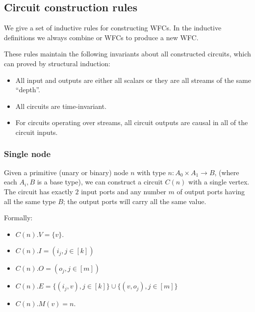 \subsection{Circuit construction rules}

We give a set of inductive rules for constructing WFCs.
In the inductive definitions we always combine or WFCs to
produce a new WFC.

These rules maintain the following invariants about all constructed circuits, which
can proved by structural induction:
\begin{itemize}
    \item All input and outputs are either all scalars
    or they are all streams of the same ``depth''.
    \item All circuits are time-invariant.
    \item For circuits operating over streams, all circuit outputs are causal
    in all of the circuit inputs.
\end{itemize}

\subsubsection{Single node}

Given a primitive (unary or binary) node $n$ with type 
$n: A_0 \times A_1 \rightarrow B$, (where each $A_i, B$
is a base type), we can construct a circuit $C(n)$ with a single vertex.  The circuit has exactly 
$2$ input ports and any number $m$ of output ports having all the same type $B$;
the output ports will carry all the same value. 


Formally:

\begin{itemize}
    \item $C(n).V = \{v\}$.
    \item $C(n).I = (i_j, j \in [k])$
    \item $C(n).O = (o_j, j \in [m])$
    \item $C(n).E = \{ (i_j, v), j \in [k] \} \cup \{ (v, o_j), j \in [m] \}$
    \item $C(n).M(v) = n$.
\end{itemize}

